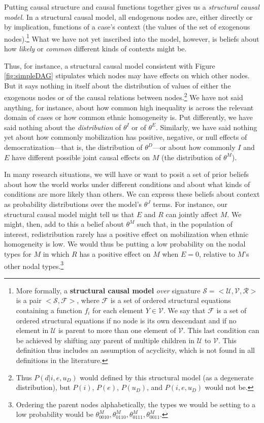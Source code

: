 \documentclass[
  12pt,
]{book}
\begin{document}
Putting causal structure and causal functions together gives us a \emph{structural causal model.} In a structural causal model, all endogenous nodes are, either directly or by implication, functions of a case's context (the values of the set of exogenous nodes).\footnote{More formally, a \textbf{structural causal model} \emph{over} signature \(\mathcal{S}=<\mathcal{U},\mathcal{V},\mathcal{R}>\) is a pair \(<\mathcal{S}, \mathcal{F}>\), where \(\mathcal{F}\) is a set of ordered structural equations containing a function \(f_i\) for each element \(Y\in \mathcal{V}\). We say that \(\mathcal{F}\) is a set of ordered structural equations if no node is its own descendant and if no element in \(\mathcal{U}\) is parent to more than one element of \(\mathcal{V}\). This last condition can be achieved by shifting any parent of multiple children in \(\mathcal{U}\) to \(\mathcal{V}\). This definition thus includes an assumption of acyclicity, which is not found in all definitions in the literature.} What we have not yet inscribed into the model, however, is beliefs about how \emph{likely} or \emph{common} different kinds of contexts might be.

Thus, for instance, a structural causal model consistent with Figure \ref{fig:simpleDAG} stipulates which nodes may have effects on which other nodes. But it says nothing in itself about the distribution of values of either the exogenous nodes or of the causal relations between nodes.\footnote{Thus \(P(d|i,e, u_D)\) would defined by this structural model (as a degenerate distribution), but \(P(i)\), \(P(e)\), \(P(u_D)\), and \(P(i,e, u_D)\) would not be.} We have not said anything, for instance, about how common high inequality is across the relevant domain of cases or how common ethnic homogeneity is. Put differently, we have said nothing about the \emph{distribution} of \(\theta^I\) or of \(\theta^E\). Similarly, we have said nothing yet about how commonly mobilization has positive, negative, or null effects of democratization---that is, the distribution of \(\theta^D\)---or about how commonly \(I\) and \(E\) have different possible joint causal effects on \(M\) (the distribution of \(\theta^M\)).

In many research situations, we will have or want to posit a set of prior beliefs about how the world works under different conditions and about what kinds of conditions are more likely than others. We can express these beliefs about context as probability distributions over the model's \(\theta^J\) terms. For instance, our structural causal model might tell us that \(E\) and \(R\) can jointly affect \(M\). We might, then, add to this a belief about \(\theta^M\) such that, in the population of interest, redistribution rarely has a positive effect on mobilization when ethnic homogeneity is low. We would thus be putting a low probability on the nodal types for \(M\) in which \(R\) has a positive effect on \(M\) when \(E=0\), relative to \(M\)'s other nodal types.\footnote{Ordering the parent nodes alphabetically, the types we would be setting to a low probability would be \(\theta^M_{0010}, \theta^M_{0110}, \theta^M_{0111}, \theta^M_{0011}\).}
\end{document}
